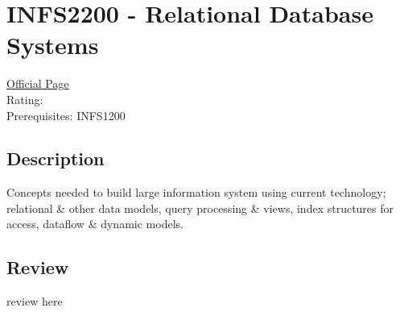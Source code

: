 \hypertarget{INFS2200}{\section{INFS2200 - Relational Database Systems}}

\large
\textcolor{turbo_purple}{\href{https://my.uq.edu.au/programs-courses/course.html?course_code=INFS2200}{Official Page}} \\
Rating: \cstar\cstar\cstar\cstar\ostar \\
Prerequisites: INFS1200

\normalsize
\subsection*{Description}
Concepts needed to build large information system using current technology; relational \& other data models, query processing \& views, index structures for access, dataflow \& dynamic models.

\subsection*{Review}
review here
